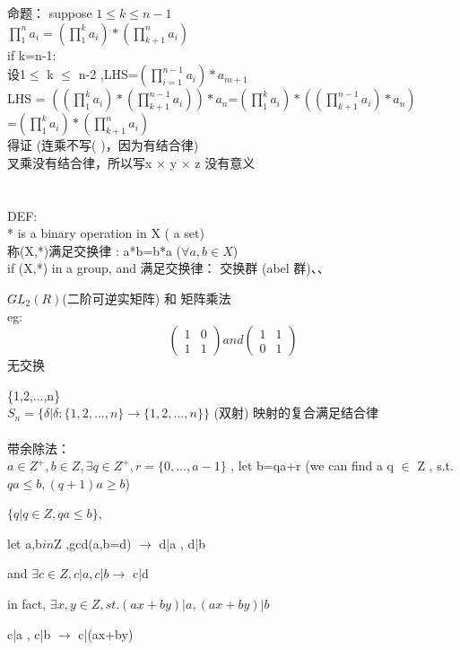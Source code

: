 \documentclass[12pt, a4paper]{article}  %
\begin{document}
命题： suppose \(1\leqslant k\leqslant n-1\)\\
\(\prod_{1}^{n} a_i =(\prod_{1}^{k} a_i)*(\prod_{k+1}^{n} a_i)\)\\
if k=n-1:\\
设1\(\leqslant \) k \(\leqslant \) n-2 ,LHS=\((\prod_{i=1}^{n-1} a_i)*a_{m+1}\)\\
LHS = \(((\prod_{1}^{k} a_i)*(\prod_{k+1}^{n-1} a_i))*a_n\)=\((\prod_{1}^{k} a_i)*((\prod_{k+1}^{n-1} a_i)*a_n)\)\\
=\((\prod_{1}^{k} a_i)*(\prod_{k+1}^{n} a_i)\)\\
得证
(连乘不写( )，因为有结合律)
\\
叉乘没有结合律，所以写x \(\times\) y \(\times\) z 没有意义
\\
\\
\\
DEF:\\ * is a binary operation in X ( a set)\\
称(X,*)满足交换律 : a*b=b*a   (\(\forall a, b \in X\))\\
if (X,*) in a group, and 满足交换律： 交换群  (abel 群)、、

\(GL_2(R)\)(二阶可逆实矩阵)  和  矩阵乘法\\
eg:
\[
\begin{pmatrix}
1 & 0  \\
1 & 1
\end{pmatrix}
and
\begin{pmatrix}
    1 & 1  \\
    0 & 1
    \end{pmatrix}
\]  无交换

\{1,2,...,n\}\\
\(S_n=\{\delta | \delta : \{1,2,...,n\}\rightarrow \{1,2,...,n\}\}\) (双射)
映射的复合满足结合律
\\\\
带余除法：\\
\(a \in Z^{+} , b \in Z , \exists q \in Z^{+} , r=\{0,...,a-1\}\) 
, let b=qa+r  (we can find a q \(\in\) Z , s.t. \(qa \leqslant b ,  (q+1)a \geqslant b\))

\( \{q|q \in Z , qa \leqslant b\}\), 

let a,b\(in\)Z ,gcd(a,b=d)  \(\rightarrow \) d|a , d|b 

and \(\exists  c \in Z , c|a ,c|b \)\(\rightarrow \) c|d

in fact, \(\exists x,y \in Z ,st. (ax+by)|a , (ax+by)|b \)

c|a , c|b \(\rightarrow\) c|(ax+by)  \\
\end{document}
